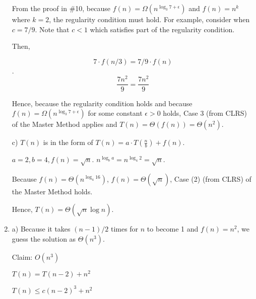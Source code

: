 \documentclass[a4paper]{report}
\begin{document}
\begin{enumerate}
      From the proof in \#10, because $f(n) = \Omega(n^{\log_3 7 + \epsilon})$ and $f(n) = n^k$ where $k=2$,
      the regularity condition must hold. For example, consider when $c = 7/9$. Note that $c < 1$ which satisfies part of the
      regularity condition. 
      
      Then,
      
      $$7 \cdot f(n/3) = 7/9 \cdot f(n)$$.
      $$\frac{7 n^2}{9}= \frac{7 n^2}{9}$$ 

      Hence, because the regularity condition holds and because $f(n) = \Omega(n^{\log_3 7 + \epsilon})$ for some constant $\epsilon>0$ holds,
      Case 3 (from CLRS) of the Master Method applies and $T(n) = \Theta(f(n)) = \Theta(n^2)$.


      \bigskip
      c) 
      $T(n)$ is in the form of $T(n) = a \cdot T(\frac{n}{b}) + f(n)$.
      
      $a = 2, b = 4, f(n) = \sqrt{n}$. $n^{\log_b a} = n^{\log_4 2} = \sqrt{n}$. 

      Because $f(n) = \Theta(n^{\log_4 16})$, $f(n) = \Theta(\sqrt{n})$, Case (2) (from CLRS) of the Master Method holds. 

      Hence, $T(n) = \Theta(\sqrt{n} \log n)$. 

    \par
    \bigskip

    \item

      a) Because it takes $(n-1)/2$ times for $n$ to become 1 and $f(n) = n^2$, we guess the solution as $\Theta(n^3)$.

      Claim: $O(n^3)$

      $T(n) = T(n-2) + n^2$

      $T(n) \leq c(n-2)^3 + n^2$



\end{enumerate}
\end{document}
